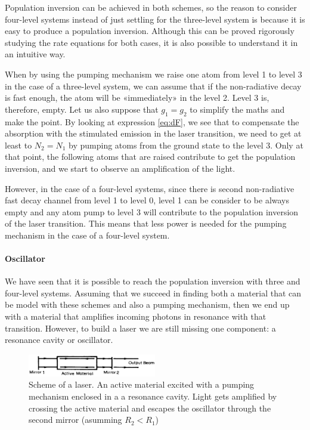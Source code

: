 \documentclass[11pt,a4paper]{article}
\begin{document}
Population inversion can be achieved in both schemes, so the reason to consider four-level systems instead of just settling for the three-level system is because it is easy to produce a population inversion. Although this can be proved rigorously studying the rate equations for both cases, it is also possible to understand it in an intuitive way.

When by using the pumping mechanism we raise one atom from level 1 to level 3 in the case of a three-level system, we can assume that if the non-radiative decay is fast enough, the atom will be «immediately» in the level 2. Level 3 is, therefore, empty. Let us also suppose that $g_1=g_2$ to simplify the maths and make the point. By looking at expression \eqref{eq:dF}, we see that to compensate the absorption with the stimulated emission in the laser transition, we need to get at least to $N_2=N_1$ by pumping atoms from the ground state to the level 3. Only at that point, the following atoms that are raised contribute to get the population inversion, and we start to observe an amplification of the light.

However, in the case of a four-level systems, since there is second non-radiative fast decay channel from level 1 to level 0, level 1 can be consider to be always empty and any atom pump to level 3 will contribute to the population inversion of the laser transition. This means that less power is needed for the pumping mechanism in the case of a four-level system.

\paragraph{Oscillator}
We have seen that it is possible to reach the population inversion with three and four-level systems. Assuming that we succeed in finding both a material that can be model with these schemes and also a pumping mechanism, then we end up with a material that amplifies incoming photons in resonance with that transition. However, to build a laser we are still missing one component: a resonance cavity or oscillator.

\begin{figure}[ht]
\centering
\includegraphics[width=0.5\textwidth]{laser}
\caption{Scheme of a laser. An active material excited with a pumping mechanism enclosed in a a resonance cavity. Light gets amplified by crossing the active material and escapes the oscillator through the second mirror (asumming $R_2<R_1$) \cite{hariharan_2002}}
\label{fig:laser}
\end{figure}
\end{document}

